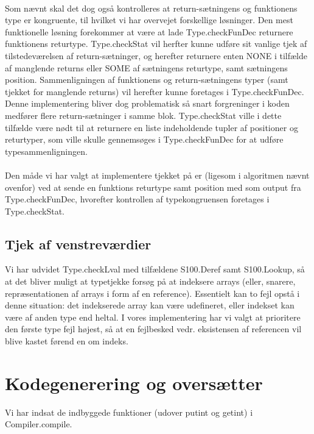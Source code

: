 \documentclass[10pt,a4paper,danish]{article}
\begin{document}
\paragraph{}
Som nævnt skal det dog også kontrolleres at return-sætningens og funktionens
type er kongruente, til hvilket vi har overvejet forskellige løsninger. Den
mest funktionelle løsning forekommer at være at lade Type.checkFunDec returnere
funktionens returtype. Type.checkStat vil herfter kunne udføre sit vanlige
tjek af tilstedeværelsen af return-sætninger, og herefter returnere enten NONE
i tilfælde af manglende returns eller SOME af sætningens returtype, samt
sætningens position. 
Sammenligningen af funktionens og return-sætningens typer (samt tjekket
for manglende returns) vil herefter kunne foretages i Type.checkFunDec.
Denne implementering bliver dog problematisk så 
snart forgreninger i koden medfører flere return-sætninger i samme blok.
Type.checkStat
ville i dette tilfælde være nødt til at returnere en liste indeholdende
tupler af positioner og returtyper, som ville skulle gennemsøges i 
Type.checkFunDec for at udføre typesammenligningen. 

\paragraph{}
Den måde vi har valgt at implementere tjekket på er (ligesom i algoritmen 
nævnt ovenfor) ved at sende en funktions returtype samt position med som 
output fra Type.checkFunDec, hvorefter kontrollen af typekongruensen foretages
i Type.checkStat. 


\subsection{Tjek af venstreværdier}
Vi har udvidet Type.checkLval med tilfældene S100.Deref samt
S100.Lookup, så at det bliver muligt at typetjekke forsøg på 
at indeksere arrays (eller, snarere, repræsentationen af arrays
i form af en reference). Essentielt kan to fejl opstå i denne 
situation: det indekserede array kan være udefineret, eller 
indekset kan være af anden type end heltal. I vores implementering
har vi valgt at prioritere den første type fejl højest, så at 
en fejlbesked vedr. eksistensen af referencen vil blive kastet
førend en om indeks. 

\section{Kodegenerering og oversætter}
Vi har indsat de indbyggede funktioner (udover putint og getint) i 
Compiler.compile. 
\end{document}
